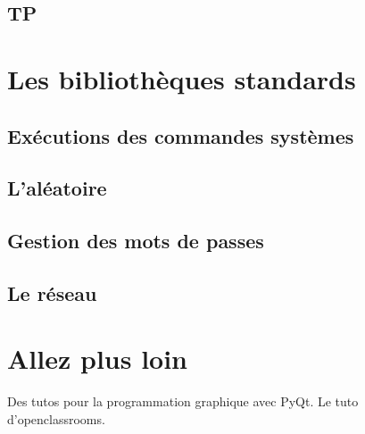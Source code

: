 \documentclass[12pt]{article}
\begin{document}
    \subsection{TP}

\section{Les bibliothèques standards}
    \subsection{Exécutions des commandes systèmes}
    \subsection{L'aléatoire}
    \subsection{Gestion des mots de passes}
    \subsection{Le réseau}

\section{Allez plus loin}
    Des tutos pour la programmation graphique avec PyQt. Le tuto d'openclassrooms.
\end{document}
